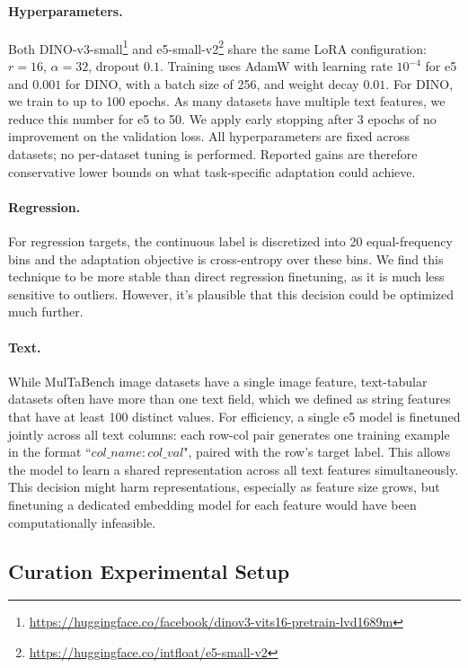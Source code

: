 \documentclass{llmxive}
\begin{document}
\paragraph{Hyperparameters.} Both DINO-v3-small\footnote{\url{https://huggingface.co/facebook/dinov3-vits16-pretrain-lvd1689m}} and e5-small-v2\footnote{\url{https://huggingface.co/intfloat/e5-small-v2}} share the same LoRA configuration: $r=16$, $\alpha=32$, dropout $0.1$. Training uses AdamW with learning rate $10^{-4}$ for e5 and $0.001$ for DINO, with a batch size of 256, and weight decay $0.01$. For DINO, we train to up to 100 epochs. As many datasets have multiple text features, we reduce this number for e5 to 50. We apply early stopping after 3 epochs of no improvement on the validation loss. All hyperparameters are fixed across datasets; no per-dataset tuning is performed. Reported gains are therefore conservative lower bounds on what task-specific adaptation could achieve.

\paragraph{Regression.} For regression targets, the continuous label is discretized into 20 equal-frequency bins and the adaptation objective is cross-entropy over these bins. We find this technique to be more stable than direct regression finetuning, as it is much less sensitive to outliers. However, it's plausible that this decision could be optimized much further.

\paragraph{Text.} While MulTaBench image datasets have a single image feature, text-tabular datasets often have more than one text field, which we defined as string features that have at least 100 distinct values. For efficiency, a single e5 model is finetuned jointly across all text columns: each row-col pair generates one training example in the format ``$col\_name: col\_val$", paired with the row's target label. This allows the model to learn a shared representation across all text features simultaneously. This decision might harm representations, especially as feature size grows, but finetuning a dedicated embedding model for each feature would have been computationally infeasible.


\subsection{Curation Experimental Setup}
\end{document}
